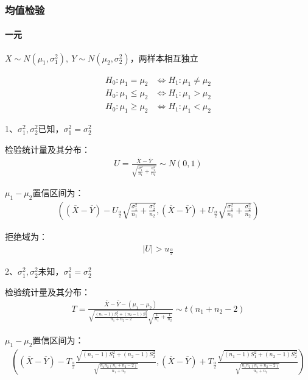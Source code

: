 \documentclass[12pt]{book}
\begin{document}
\subsubsection{均值检验}

\paragraph{一元}
$X\sim N\left(\mu_1,\sigma_1^2\right),\ Y\sim N\left(\mu_2,\sigma_2^2\right)$，两样本相互独立

\begin{align*}
    H_0: \mu_1=\mu_2    & \Leftrightarrow H_1: \mu_1\neq\mu_2 \\
    H_0: \mu_1\le\mu_2  & \Leftrightarrow H_1: \mu_1>\mu_2    \\
    H_0: \mu_1\geq\mu_2 & \Leftrightarrow H_1: \mu_1<\mu_2
\end{align*}


1、$\sigma_1^2,\sigma_2^2$已知，$\sigma_1^2=\sigma_2^2$

检验统计量及其分布：
\begin{gather*}
    U=\frac{\overline{X}-\overline{Y}}{\sqrt{\frac{\sigma_1^2}{n_1}+\frac{\sigma_2^2}{n_2}}}\sim N(0,1)
\end{gather*}

$\mu_1-\mu_2$置信区间为：
\begin{gather*}
    \left(
        (\overline{X}-\overline{Y})-U_{\frac{\alpha}{2}} \sqrt{\frac{\sigma_1^2}{n_1}+\frac{\sigma_2^2}{n_2}},
        (\overline{X}-\overline{Y})+U_{\frac{\alpha}{2}} \sqrt{\frac{\sigma_1^2}{n_1}+\frac{\sigma_2^2}{n_2}}
    \right)
\end{gather*}


拒绝域为：
\begin{gather*}
    \left|U\right|>u_{\frac{\alpha}{2}}
\end{gather*}


2、$\sigma_1^2,\sigma_2^2$未知，$\sigma_1^2=\sigma_2^2$

检验统计量及其分布：
\begin{gather*}
    T=\frac{\overline{X}-\overline{Y}-(\mu_1-\mu_2)}{\sqrt{\frac{\left(n_1-1\right)S_1^2+\left(n_2-1\right)S_2^2}{n_1+n_2-2}}\sqrt{\frac{1}{n_1}+\frac{1}{n_2}}}\sim t(n_1+n_2-2)
\end{gather*}


$\mu_1-\mu_2$置信区间为：
\begin{gather*}
    \left(
(\overline{X}-\overline{Y})-T_{\frac{\alpha}{2}}\frac{ \sqrt{(n_1-1)S_1^2+(n_2-1)S_2^2} }{ \sqrt{ \frac{ n_1 n_2 (n_1+n_2 -2) }{ n_1+n_2 } } } ,
(\overline{X}-\overline{Y})+T_{\frac{\alpha}{2}}\frac{ \sqrt{(n_1-1)S_1^2+(n_2-1)S_2^2} }{ \sqrt{ \frac{ n_1 n_2 (n_1+n_2 -2) }{ n_1+n_2 } } }
    \right)
\end{gather*}
\end{document}
